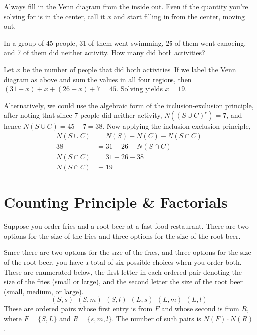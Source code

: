 \begin{keypoint}
Always fill in the Venn diagram from the inside out. Even if the quantity you're solving for is in the center, call it $x$ and start filling in from the center, moving out.
\end{keypoint}

\begin{example}
In a group of 45 people, 31 of them went swimming, 26 of them went canoeing, and 7 of them did neither activity. How many did both activities?

\begin{center}
\end{center}

Let $x$ be the number of people that did both activities. If we label the Venn diagram as above and sum the values in all four regions, then $(31-x) + x + (26-x) + 7 = 45$. Solving yields $x = 19$.

Alternatively, we could use the algebraic form of the inclusion-exclusion principle, after noting that since 7 people did neither activity, $N((S \cup C)^c) = 7$, and hence $N(S \cup C) = 45 - 7 = 38$. Now applying the inclusion-exclusion principle,
$$\begin{aligned}
N(S \cup C) &= N(S) + N(C) - N (S \cap C) \\
38 &= 31 + 26 - N (S \cap C) \\
N (S \cap C) &= 31 + 26 - 38 \\
N (S \cap C) &= 19
\end{aligned}$$

\end{example}

\section{Counting Principle \& Factorials}

Suppose you order fries and a root beer at a fast food restaurant. There are two options for the size of the fries and three options for the size of the root beer.

Since there are two options for the size of the fries, and three options for the size of the root beer, you have a total of six possible choices when you order both. These are enumerated below, the first letter in each ordered pair denoting the size of the fries (small or large), and the second letter the size of the root beer (small, medium, or large).
$$(S,s)\ \ (S,m)\ \ (S,l)\ \ (L,s)\ \ (L,m)\ \ (L,l)$$
These are ordered pairs whose first entry is from $F$ and whose second is from $R$, where $F = \{S,L\}$ and $R = \{s,m,l\}$. The number of such pairs is $N(F) \cdot N(R)$.

